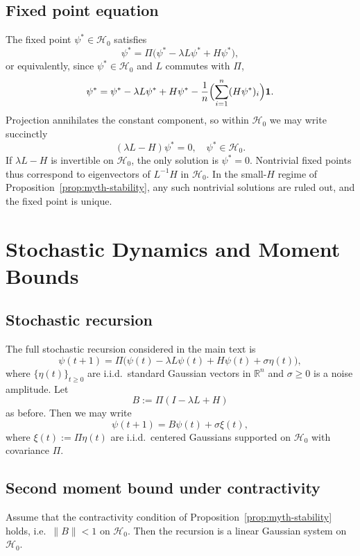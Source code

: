 \documentclass[11pt]{article}
\begin{document}
\subsection{Fixed point equation}

The fixed point \(\psi^\ast\in\mathcal{H}_0\) satisfies
\[
\psi^\ast = \Pi\bigl(\psi^\ast - \lambda L\psi^\ast + H\psi^\ast\bigr),
\]
or equivalently, since \(\psi^\ast\in\mathcal{H}_0\) and \(L\) commutes
with \(\Pi\),
\[
\psi^\ast = \psi^\ast - \lambda L\psi^\ast + H\psi^\ast - \frac{1}{n}
\Bigl(\sum_{i=1}^n (H\psi^\ast)_i\Bigr)\mathbf{1}.
\]
Projection annihilates the constant component, so within \(\mathcal{H}_0\)
we may write succinctly
\[
(\lambda L - H)\psi^\ast = 0,\quad \psi^\ast \in \mathcal{H}_0.
\]
If \(\lambda L - H\) is invertible on \(\mathcal{H}_0\), the only solution
is \(\psi^\ast = 0\). Nontrivial fixed points thus correspond to eigenvectors
of \(L^{-1}H\) in \(\mathcal{H}_0\). In the small-\(H\) regime of
Proposition~\ref{prop:myth-stability}, any such nontrivial solutions are
ruled out, and the fixed point is unique.

\section{Stochastic Dynamics and Moment Bounds}

\subsection{Stochastic recursion}

The full stochastic recursion considered in the main text is
\begin{equation}
\psi(t+1)
  = \Pi\bigl(\psi(t) - \lambda L\psi(t) + H\psi(t) + \sigma\eta(t)\bigr),
\label{eq:stochastic-dynamics}
\end{equation}
where \(\{\eta(t)\}_{t\ge 0}\) are i.i.d.\ standard Gaussian vectors in
\(\mathbb{R}^n\) and \(\sigma\ge 0\) is a noise amplitude. Let
\[
B := \Pi(I - \lambda L + H)
\]
as before. Then we may write
\[
\psi(t+1) = B\psi(t) + \sigma \xi(t),
\]
where \(\xi(t) := \Pi\eta(t)\) are i.i.d.\ centered Gaussians supported
on \(\mathcal{H}_0\) with covariance \(\Pi\).

\subsection{Second moment bound under contractivity}

Assume that the contractivity condition of Proposition~\ref{prop:myth-stability}
holds, i.e.\ \(\|B\|<1\) on \(\mathcal{H}_0\). Then the recursion is a
linear Gaussian system on \(\mathcal{H}_0\).
\end{document}
